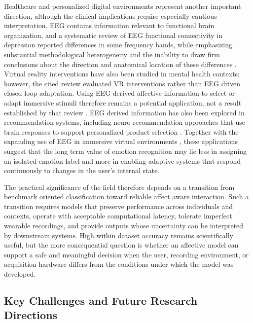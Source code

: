 \documentclass[ASNA,twocolumn]{USG}
\begin{document}
Healthcare and personalized digital environments represent another important direction, although the clinical implications require especially cautious interpretation. EEG contains information relevant to functional brain organization, and a systematic review of EEG functional connectivity in depression reported differences in some frequency bands, while emphasizing substantial methodological heterogeneity and the inability to draw firm conclusions about the direction and anatomical location of these differences \cite{miljevic2023alterations}. Virtual reality interventions have also been studied in mental health contexts; however, the cited review evaluated VR interventions rather than EEG driven closed loop adaptation. Using EEG derived affective information to select or adapt immersive stimuli therefore remains a potential application, not a result established by that review \cite{pira2023use}. EEG derived information has also been explored in recommendation systems, including neuro recommendation approaches that use brain responses to support personalized product selection \cite{panda2024eeg}. Together with the expanding use of EEG in immersive virtual environments \cite{choi2023neural}, these applications suggest that the long term value of emotion recognition may lie less in assigning an isolated emotion label and more in enabling adaptive systems that respond continuously to changes in the user's internal state.

The practical significance of the field therefore depends on a transition from benchmark oriented classification toward reliable affect aware interaction. Such a transition requires models that preserve performance across individuals and contexts, operate with acceptable computational latency, tolerate imperfect wearable recordings, and provide outputs whose uncertainty can be interpreted by downstream systems. High within dataset accuracy remains scientifically useful, but the more consequential question is whether an affective model can support a safe and meaningful decision when the user, recording environment, or acquisition hardware differs from the conditions under which the model was developed.

\subsection{Key Challenges and Future Research Directions}
\label{subsec:limitations_future}
\end{document}
